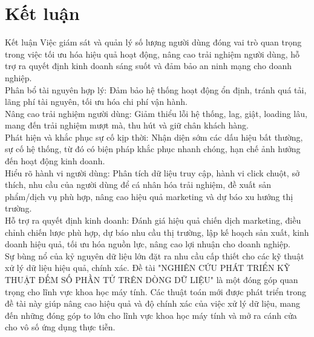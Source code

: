 \documentclass[10pt]{beamer}
\newcommand{\themename}{\textbf{\textsc{metropolis}}\xspace}
\begin{document}
\section{Kết luận}
\begin{frame}{Kết luận}
  Việc giám sát và quản lý số lượng người dùng đóng vai trò quan trọng trong việc tối ưu hóa hiệu quả hoạt động, 
nâng cao trải nghiệm người dùng, hỗ trợ ra quyết định kinh doanh sáng suốt và đảm bảo an ninh mạng cho doanh nghiệp.\\

Phân bổ tài nguyên hợp lý: Đảm bảo hệ thống hoạt động ổn định, tránh quá tải, lãng phí tài nguyên, tối ưu hóa chi phí vận hành.\\

Nâng cao trải nghiệm người dùng: Giảm thiểu lỗi hệ thống, lag, giật, loading lâu, mang đến trải nghiệm mượt mà, thu hút và giữ chân khách hàng.\\

Phát hiện và khắc phục sự cố kịp thời: Nhận diện sớm các dấu hiệu bất thường, sự cố hệ thống, từ đó có biện pháp khắc phục nhanh chóng, hạn chế ảnh hưởng đến hoạt động kinh doanh.\\

Hiểu rõ hành vi người dùng: Phân tích dữ liệu truy cập, hành vi click chuột, sở thích, nhu cầu của người dùng để cá nhân hóa trải nghiệm, đề xuất sản phẩm/dịch vụ phù hợp, 
nâng cao hiệu quả marketing và dự báo xu hướng thị trường.\\

Hỗ trợ ra quyết định kinh doanh: Đánh giá hiệu quả chiến dịch marketing, điều chỉnh chiến lược phù hợp, dự báo nhu cầu thị trường, 
lập kế hoạch sản xuất, kinh doanh hiệu quả, tối ưu hóa nguồn lực, nâng cao lợi nhuận cho doanh nghiệp.\\

Sự bùng nổ của kỷ nguyên dữ liệu lớn đặt ra nhu cầu cấp thiết cho các kỹ thuật xử lý dữ liệu hiệu quả, chính xác. 
Đề tài "NGHIÊN CỨU PHÁT TRIỂN KỸ THUẬT ĐẾM SỐ PHẦN TỬ TRÊN DÒNG DỮ LIỆU" là một đóng góp quan trọng cho lĩnh vực khoa học máy tính. 
Các thuật toán mới được phát triển trong đề tài này giúp nâng cao hiệu quả và độ chính xác của việc xử lý dữ liệu, mang đến những đóng góp 
to lớn cho lĩnh vực khoa học máy tính và mở ra cánh cửa cho vô số ứng dụng thực tiễn.\\
\end{frame}

\end{document}
